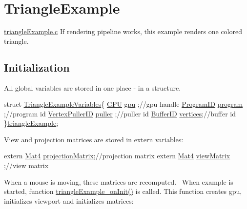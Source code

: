 \hypertarget{TriangleExample-example}{}\section{Triangle\+Example}
\hyperlink{triangleExample_8c}{triangle\+Example.\+c}  If rendering pipeline works, this example renders one colored triangle. ~\newline
 \hypertarget{triangleExample.c_Initialization}{}\subsection{Initialization}\label{triangleExample.c_Initialization}
All global variables are stored in one place -\/ in a structure. 
\begin{DoxyCodeInclude}

\textcolor{keyword}{struct }\hyperlink{structTriangleExampleVariables}{TriangleExampleVariables}\{
  \hyperlink{fwd_8h_a06964ec111fe28721d8618b6d0d993bf}{GPU}            \hyperlink{structTriangleExampleVariables_a6c5c3f82065ae9aac07f9e6f11dd03b3}{gpu}     ;\textcolor{comment}{//gpu handle}
\textcolor{comment}{}  \hyperlink{fwd_8h_a15e62786033208aec9487a51e808f81d}{ProgramID}      \hyperlink{structTriangleExampleVariables_aabf788228d2e91e2718facfbd911c8cc}{program} ;\textcolor{comment}{//program id}
\textcolor{comment}{}  \hyperlink{fwd_8h_a23828e2281a794e193ebaf0df3e1f17c}{VertexPullerID} \hyperlink{structTriangleExampleVariables_a82e39dd0d18fc57422686229d801e39f}{puller}  ;\textcolor{comment}{//puller id}
\textcolor{comment}{}  \hyperlink{fwd_8h_a60a12bf4868ebe47cc571ce96a03f99c}{BufferID}       \hyperlink{structTriangleExampleVariables_acb7968b625f2e01866994769209cf32e}{vertices};\textcolor{comment}{//buffer id}
\}\hyperlink{triangleExample_8c_af82b723635ac0c90962571915a1b1163}{triangleExample};
\end{DoxyCodeInclude}
View and projection matrices are stored in extern variables\+: 
\begin{DoxyCodeInclude}
\textcolor{keyword}{extern} \hyperlink{structMat4}{Mat4} \hyperlink{mouseCamera_8c_a1f344d924f733a22d7659db612a0efe8}{projectionMatrix};\textcolor{comment}{//projection matrix}
\textcolor{comment}{}\textcolor{keyword}{extern} \hyperlink{structMat4}{Mat4} \hyperlink{mouseCamera_8c_ae64ebe4c77936fc93d161b97bd8e96df}{viewMatrix}      ;\textcolor{comment}{//view matrix}
\end{DoxyCodeInclude}
When a mouse is moving, these matrices are recomputed.~\newline
 When example is started, function \hyperlink{triangleExample_8c_a73184b4ab6bb513ad9a9a4c36e92646b}{triangle\+Example\+\_\+on\+Init()} is called. This function creates gpu, initializes viewport and initializes matrices\+: 
